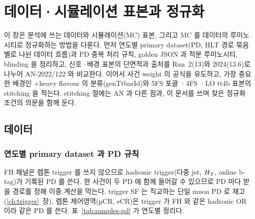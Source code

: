\chapter{데이터·시뮬레이션 표본과 정규화}\label{ch:samples}

이 장은 분석에 쓰는 데이터와 시뮬레이션(MC) 표본, 그리고 MC 를 데이터의 루미노시티로 정규화하는 방법을 다룬다. 먼저 연도별 primary dataset(PD,
HLT 경로 묶음별로 나뉜 데이터 흐름)과 PD 중복 처리 규칙, golden JSON 과 적분 루미노시티, blinding 을 정리하고, 신호·배경 표본의 단면적과 출처를
Run~2(13\TeV)와 2024(13.6\TeV)로 나누어 AN-2022/122 와 비교한다. 이어서 사건 weight 의 공식을 유도하고, 가장 중요한 배경인 \ttbar+heavy flavour 의
분류(genTtbarId)와 5FS 포괄 \ttbar·4FS \ttbb·LO tt4b 표본의 stitching 을 적는다. stitching 절에는 AN 과 다른 점과, 이 문서를 쓰며 찾은 정규화 조건의
의문을 함께 둔다.

\section{데이터}\label{sec:samples-data}

\subsection{연도별 primary dataset 과 PD 규칙}\label{sec:samples-pd}

FH 채널은 렙톤 trigger 를 쓰지 않으므로 hadronic trigger(다중 jet, $H_{\mathrm{T}}$, online b-tag)가 기록된 PD 를 쓴다. 한 사건이 두 PD 에 함께 들어갈 수 있으므로
PD 마다 받을 경로를 정해 이중 계산을 막는다. trigger SF 는 직교하는 단일 muon PD 로 재고(\ref{ch:trigger}~장), 렙톤 제어영역(µCR, eCR)은 trigger 가 FH 와
같은 hadronic OR 이라 같은 PD 를 쓴다. 표~\ref{tab:samples-pd} 가 연도별 정리다.

